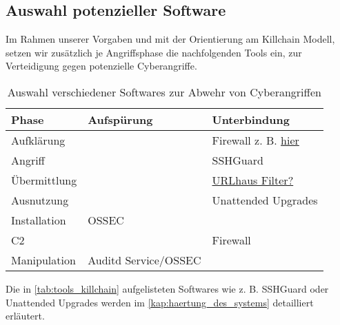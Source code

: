 \subsection{Auswahl potenzieller Software}

Im Rahmen unserer Vorgaben und mit der Orientierung am Killchain Modell, setzen wir zusätzlich je Angriffsphase die nachfolgenden Tools ein, zur Verteidigung gegen potenzielle Cyberangriffe.

\begin{table}[]
    \begin{center}
        \begin{tabular}{|l|l|l|}
            \hline
            Phase        & Aufspürung     & Unterbindung        \\ \hline
            Aufklärung   &                & Firewall z. B. \href{https://feodotracker.abuse.ch/blocklist/}{hier}            \\ \hline
            Angriff      &                & SSHGuard            \\ \hline
            Übermittlung &                & \href{https://gitlab.com/malware-filter/urlhaus-filter}{URLhaus Filter?}     \\ \hline
            Ausnutzung   &                & Unattended Upgrades \\ \hline
            Installation & OSSEC          &                     \\ \hline
            C2           &                & Firewall            \\ \hline
            Manipulation & Auditd Service/OSSEC &                     \\ \hline
        \end{tabular}
    \end{center}
    \caption{Auswahl verschiedener Softwares zur Abwehr von Cyberangriffen}
    \label{tab:tools_killchain}
\end{table}

Die in \autoref{tab:tools_killchain} aufgelisteten Softwares wie z. B. SSHGuard oder Unattended Upgrades werden im \autoref{kap:haertung_des_systems} detailliert erläutert.